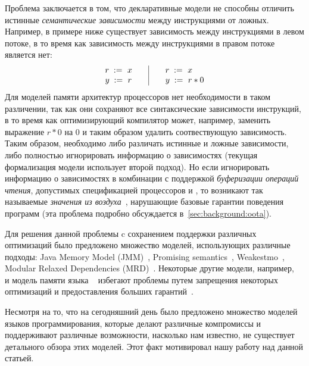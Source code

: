 Проблема заключается в том, что декларативные модели не способны 
отличить истинные \emph{семантические зависимости} между инструкциями от ложных.
Например, в примере ниже существует зависимость между 
инструкциями в левом потоке, в то время как зависимость между 
инструкциями в правом потоке является нет:
\[\begin{array}{l@{\qquad}|@{\qquad}l}
\readInst{}{r}{x} & \readInst{}{r}{x} \\
\writeInst{}{y}{r} & \readInst{}{y}{r * 0} \\
\end{array}\]
Для моделей памяти архитектур процессоров нет необходимости в таком различении, 
так как они сохраняют все синтаксические зависимости инструкций, 
в то время как оптимизирующий компилятор может, например, заменить выражение 
$r * 0$ на $0$ и таким образом удалить соотвествующую зависимость. 
Таким образом, необходимо либо различать истинные и ложные зависимости, 
либо полностью игнорировать информацию о зависимостях 
(текущая формализация модели \CPP использует второй подход).
Но если игнорировать информацию о зависимостях в комбинации с 
поддержкой \emph{буферизации операций чтения}, допустимых 
спецификацией процессоров \ARM и \POWER, 
то возникают так называемые 
\emph{значения из воздуха}~\cite{Boehm-Demsky:MSPC14}, 
нарушающие  базовые гарантии поведения программ
(эта проблема подробно обсуждается в~\cref{sec:background:oota}).

Для решения данной проблемы c сохранением
поддержки различных оптимизаций было предложено 
множество моделей, использующих различные подходы:
Java Memory Model (JMM)~\cite{Manson-al:POPL05}, Promising semantics~\cite{Kang-al:POPL17,Lee-al:PLDI20},
Weakestmo~\cite{Chakraborty-Vafeiadis:POPL19}, Modular Relaxed Dependencies (MRD)~\cite{Paviotti-al:ESOP20}.
Некоторые другие модели, например, \RCMM~\cite{Lahav-al:PLDI17} и модель памяти языка \OCaml~\cite{Dolan-al:PLDI18} избегают проблемы путем запрещения некоторых оптимизаций и предоставления больших гарантий~\cite{Ou-Demsky:OOPSLA18}.

Несмотря на то, что на сегодняшний день было предложено множество моделей языков программирования, которые
делают различные компромиссы и поддерживают различные возможности, 
насколько нам известно, не существует детального обзора этих моделей. 
Этот факт мотивировал нашу работу над данной статьей.

